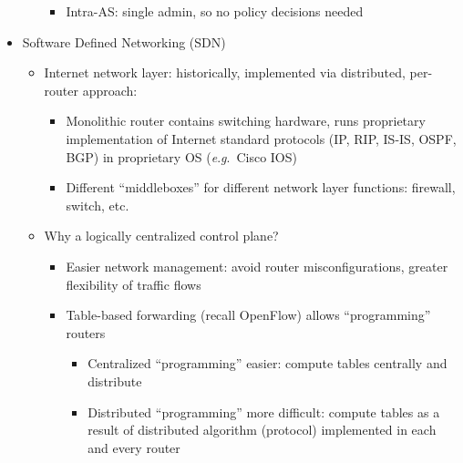 \begin{itemize}
\begin{itemize}
\begin{itemize}
          \item Intra-AS: single admin, so no policy decisions needed

        \end{itemize}

    \end{itemize}

  \item Software Defined Networking (SDN)

    \begin{itemize}

      \item Internet network layer: historically, implemented via distributed, per-router approach:

        \begin{itemize}

          \item Monolithic router contains switching hardware, runs proprietary implementation of Internet standard protocols (IP, RIP, IS-IS, OSPF, BGP) in proprietary OS (\textit{e}.\textit{g}.\ Cisco IOS)

          \item Different ``middleboxes'' for different network layer functions: firewall, switch, etc.

        \end{itemize}

      \item Why a logically centralized control plane?

        \begin{itemize}

          \item Easier network management: avoid router misconfigurations, greater flexibility of traffic flows

          \item Table-based forwarding (recall OpenFlow) allows ``programming'' routers

            \begin{itemize}

              \item Centralized ``programming'' easier: compute tables centrally and distribute

              \item Distributed ``programming'' more difficult: compute tables as a result of distributed algorithm (protocol) implemented in each and every router

            \end{itemize}


\end{itemize}
\end{itemize}
\end{itemize}

